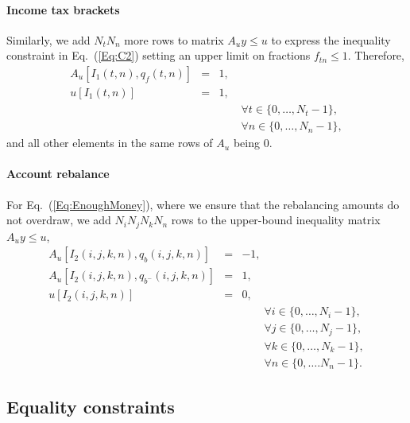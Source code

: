 \documentclass{article}[fleqn,12pt]
\begin{document}
\paragraph*{Income tax brackets}
Similarly, we add $N_t N_n$ more rows to matrix $A_uy \le u$ to express
the inequality constraint in Eq.~(\ref{Eq:C2})
setting an upper limit on fractions $f_{t n} \le 1$. Therefore,
\begin{eqnarray}
	A_u[I_1(t, n), q_f(t, n)] &=& 1, \nonumber \\
	u[I_1(t, n)] &=& 1,\\
	&&\qquad\forall t \in \{0,\ldots, N_t-1\}, \nonumber\\
	&&\qquad\forall n \in \{0,\ldots, N_n -1\},\nonumber
\end{eqnarray}
and all other elements in the same rows of $A_u$ being $0$.

\paragraph{Account rebalance}
For Eq.~(\ref{Eq:EnoughMoney}), where we ensure that the
rebalancing amounts do not overdraw, we add $N_iN_jN_kN_n$ rows to the upper-bound
inequality matrix $A_uy\le u$,
\begin{eqnarray}
	A_u[I_2(i, j, k, n), q_{b}(i, j, k, n)] &=& -1, \nonumber \\
	A_u[I_2(i, j, k, n), q_{b^-}(i, j, k, n)] &=& 1, \nonumber \\
	u[I_2(i, j, k, n)] &=& 0, \\
	&&\qquad\forall i \in \{0,\ldots, N_i-1\},\nonumber\\
	&&\qquad\forall j \in \{0,\ldots, N_j-1\},\nonumber\\
	&&\qquad\forall k \in \{0,\ldots, N_k-1\},\nonumber\\
	&&\qquad\forall n \in \{0,\ldots. N_n-1\}. \nonumber
\end{eqnarray}

\subsection{Equality constraints}
\end{document}
